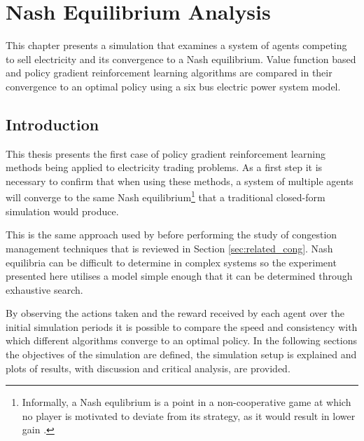 \chapter{Nash Equilibrium Analysis}
\label{ch:nashanalysis}
This chapter presents a simulation that examines a system of agents competing to
sell electricity and its convergence to a Nash equilibrium.  Value function
based and policy gradient reinforcement learning algorithms are compared in
their convergence to an optimal policy using a six bus electric power system
model.

\section{Introduction}
This thesis presents the first case of
policy gradient reinforcement learning methods being applied to electricity
trading problems.  As a first step it is necessary to confirm that when using
these methods, a system of multiple agents will converge to the same Nash
equilibrium\footnote{Informally, a Nash equlibrium is a point in a
non-cooperative game at which no player is motivated to deviate from its
strategy, as it would result in lower gain \cite{nash50,nash51}.} that
a traditional closed-form simulation would produce.

This is the same approach used by  before performing the
study of congestion management techniques that is reviewed in Section
\ref{sec:related_cong}.  Nash equilibria can be difficult
to determine in complex systems so the experiment presented here utilises a
model simple enough that it can be determined through exhaustive search.

By observing the actions taken and the reward received by each agent over the
initial simulation periods it is possible to compare the speed and consistency
with which different algorithms converge to an optimal policy. In the following
sections the objectives of the simulation are defined, the simulation setup
is explained and plots of results, with discussion and critical analysis, are
provided.

